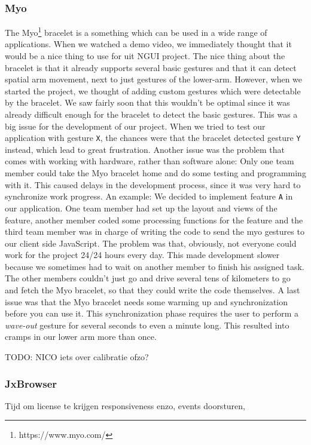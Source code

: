 \documentclass{article}
\begin{document}
\subsubsection{Myo}
The Myo\footnote{https://www.myo.com/} bracelet is a something which can be used in a wide range of applications. When we watched a demo video, we immediately thought that it would be a nice thing to use for uit NGUI project. The nice thing about the bracelet is that it already supports several basic gestures and that it can detect spatial arm movement, next to just gestures of the lower-arm. However, when we started the project, we thought of adding custom gestures which were detectable by the bracelet. We saw fairly soon that this wouldn't be optimal since it was already difficult enough for the bracelet to detect the basic gestures. This was a big issue for the development of our project. When we tried to test our application with gesture \texttt{X}, the chances were that the bracelet detected gesture \texttt{Y} instead, which lead to great frustration.
Another issue was the problem that comes with working with hardware, rather than software alone: Only one team member could take the Myo bracelet home and do some testing and programming with it. This caused delays in the development process, since it was very hard to synchronize work progress. An example: We decided to implement feature \texttt{A} in our application. One team member had set up the layout and views of the feature, another member coded some processing functions for the feature and the third team member was in charge of writing the code to send the myo gestures to our client side JavaScript. The problem was that, obviously, not everyone could work for the project 24/24 hours every day. This made development slower because we sometimes had to wait on another member to finish his assigned task. The other members couldn't just go and drive several tens of kilometers to go and fetch the Myo bracelet, so that they could write the code themselves.
A last issue was that the Myo bracelet needs some warming up and synchronization before you can use it. This synchronization phase requires the user to perform a \textit{wave-out} gesture for several seconds to even a minute long. This resulted into cramps in our lower arm more than once.

TODO: NICO iets over calibratie ofzo?


\subsubsection{JxBrowser}
Tijd om license te krijgen
responsiveness enzo, events doorsturen,
\end{document}
